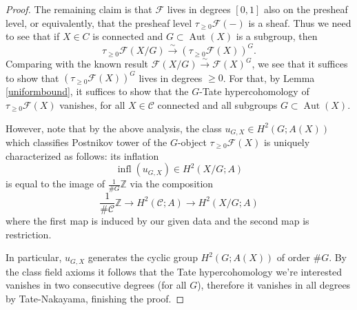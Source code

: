 \documentclass[12pt]{article}
\theoremstyle{definition}
\newcommand{\on}{\operatorname}
\newcommand{\mc}{\mathcal}
\newcommand{\mbb}{\mathbb}
\begin{document}
\begin{proof}
The remaining claim is that $\mc{F}$ lives in degrees $[0,1]$ also on the presheaf level, or equivalently, that the presheaf level $\tau_{\geq 0}\mc{F}(-)$ is a sheaf.  Thus we need to see that if $X\in{C}$ is connected and $G\subset\on{Aut}(X)$ is a subgroup, then
$$\tau_{\geq 0}\mc{F}(X/G) \overset{\sim}{\rightarrow} \left(\tau_{\geq 0}\mc{F}(X)\right)^G.$$
Comparing with the known result $\mc{F}(X/G)\overset{\sim}{\rightarrow} \mc{F}(X)^G$, we see that it suffices to show that $\left(\tau_{\geq 0}\mc{F}(X)\right)^G$ lives in degrees $\geq 0$.  For that, by Lemma \ref{uniformbound}, it suffices to show that the $G$-Tate hypercohomology of $\tau_{\geq 0}\mc{F}(X)$ vanishes, for all $X\in\mc{C}$ connected and all subgroups $G\subset \on{Aut}(X)$.

However, note that by the above analysis, the class $u_{G,X}\in H^2(G;A(X))$ which classifies Postnikov tower of the $G$-object $\tau_{\geq 0}\mc{F}(X)$ is uniquely characterized as follows: its inflation
$$\on{infl}(u_{G,X}) \in H^2(X/G;A)$$
is equal to the image of $\frac{1}{\#G}\mbb{Z}$ via the composition
$$\frac{1}{\#\mc{C}}\mbb{Z} \to H^2(\mc{C};A) \to H^2(X/G;A)$$
where the first map is induced by our given data and the second map is restriction.

In particular, $u_{G,X}$ generates the cyclic group $H^2(G;A(X))$ of order $\#G$.  By the class field axioms it follows that the Tate hypercohomology we're interested vanishes in two consecutive degrees (for all $G$), therefore it vanishes in all degrees by Tate-Nakayama, finishing the proof.
\end{proof}
\end{document}
